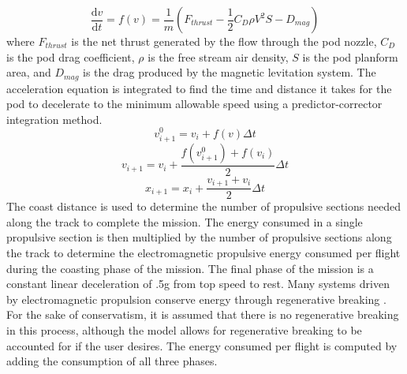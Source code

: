	\begin{equation}
		\label{eq:acceleration}
		\frac{\mathrm{d} v}{\mathrm{d} t} = f ( v  ) = \frac{1}{m} ( F_{thrust} - \frac{1}{2}C_{D}\rho V^{2}S - D_{mag})
	\end{equation}
	where $F_{thrust}$ is the net thrust generated by the flow through the pod nozzle, $C_D$ is the pod drag coefficient, $\rho$ is the free stream air density, $S$ is the pod planform area, and $D_{mag}$ is the drag produced by the magnetic levitation system. The acceleration equation is integrated to find the time and distance it takes for the pod to decelerate to the minimum allowable speed using a predictor-corrector integration method.
	\begin{equation}
		\label{eq:predictor_corrector}
		v_{i+1}^{0} = v_{i}+f(v)\Delta t
	\end{equation}
	\begin{equation}
		\label{eq:predictor_corrector_2}
		v_{i+1} = v_{i}+\frac{f(v_{i+1}^{0})+f(v_{i})}{2}\Delta t
	\end{equation}
	\begin{equation}
		\label{eq:predictor_corrector_3}
		x_{i+1} = x_{i}+\frac{v_{i+1}+v_{i}}{2}\Delta t
	\end{equation}
	The coast distance is used to determine the number of propulsive sections needed along the track to complete the mission. The energy consumed in a single propulsive section is then multiplied by the number of propulsive sections along the track to determine the electromagnetic propulsive energy consumed per flight during the coasting phase of the mission. The final phase of the mission is a constant linear deceleration of .5g from top speed to rest. Many systems driven by electromagnetic propulsion conserve energy through regenerative breaking \cite{inductrack}. For the sake of conservatism, it is assumed that there is no regenerative breaking in this process, although the model allows for regenerative breaking to be accounted for if the user desires. The energy consumed per flight is computed by adding the consumption of all three phases.

